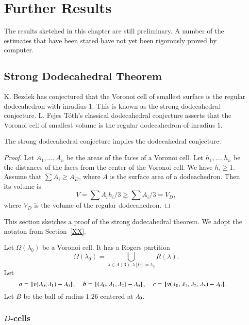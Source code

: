 
\chapter{Further Results}

\begin{note}%
The results sketched in this chapter are still preliminary.  A number of the estimates that have been stated have not yet been rigorously proved by computer. 
\end{note}

\section{Strong Dodecahedral Theorem}

K. Bezdek has conjectured that the Voronoi cell of smallest surface is the regular dodecahedron with inradius $1$.  This is known as the strong dodecahedral conjecture.  L. Fejes T\'oth's classical dodecahedral conjecture asserts that the Voronoi cell of smallest volume is the regular dodecahedron of inradius $1$.

\begin{lemma}  The strong dodecahedral conjecture implies the dodecahedral conjecture.
\end{lemma}

\begin{proof}  Let $A_1,\ldots,A_n$ be the areas of the faces of a Voronoi cell.  Let $h_1,\ldots,h_n$ be the distances of the faces from the center of the Voronoi cell.  We have $h_i\ge 1$.  Assume that $\sum A_i \ge A_D$, where $A$ is the surface area of a dodeachedron.  Then its volume is
$$
V = \sum A_i h_i/3 \ge \sum A_i/3 = V_D,
$$
where $V_D$ is the volume of the regular dodecahedron.
\end{proof}

This section sketches a proof of the strong dodecahedral theorem.  We adopt the notaton from Section~\ref{XX}.

Let $\Omega(\lambda_0)$ be a Voronoi cell.    It has a Rogers partition
$$
\Omega(\lambda_0) = \bigcup_{\lambda\in \Lambda(3),\lambda[0]=\lambda_0 } R(\lambda).
$$
Let 
$$
a = {\hskip0.1em|\hskip-0.15em|\hskip0.1em} v(\lambda_0,\lambda_1) -   \lambda_0{\hskip0.1em|\hskip-0.15em|\hskip0.1em},\quad
b = {\hskip0.1em|\hskip-0.15em|\hskip0.1em}(\lambda_0,\lambda_1,\lambda_2) -  \lambda_0{\hskip0.1em|\hskip-0.15em|\hskip0.1em},\quad
c = {\hskip0.1em|\hskip-0.15em|\hskip0.1em} v(\lambda_0,\lambda_1,\lambda_2,\lambda_3) -   \lambda_0{\hskip0.1em|\hskip-0.15em|\hskip0.1em}.\quad
$$
Let $B$ be the ball of radius $1.26$ centered at $\lambda_0$.

\subsection{$D$-cells}

